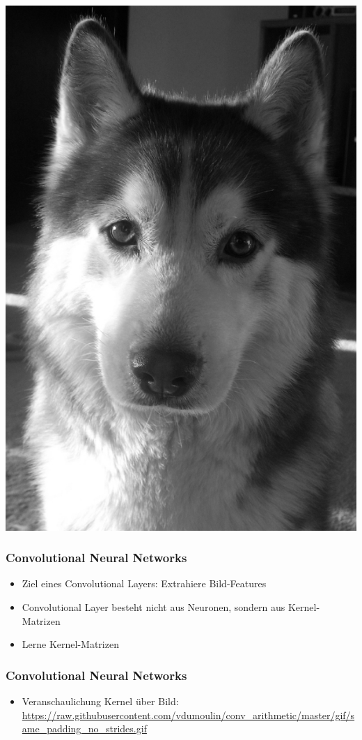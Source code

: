 \documentclass[12pt,utf8]{beamer}
\begin{document}
\begin{frame}
		\includegraphics[scale=0.2]{resources/doggo_grey.jpg}
		
		\cite{doggo}
	\end{frame}
	
	\begin{frame}
		\frametitle{Convolutional Neural Networks}
		\begin{itemize}
			\item Ziel eines Convolutional Layers: Extrahiere Bild-Features
			\item Convolutional Layer besteht nicht aus Neuronen, sondern aus Kernel-Matrizen
			\item Lerne Kernel-Matrizen
		\end{itemize}
	\end{frame}
	
	\begin{frame}
		\frametitle{Convolutional Neural Networks}
		\begin{itemize}
			\item Veranschaulichung Kernel über Bild:  \url{https://raw.githubusercontent.com/vdumoulin/conv_arithmetic/master/gif/same_padding_no_strides.gif}
		\end{itemize}
	\end{frame}
	
\end{document}
